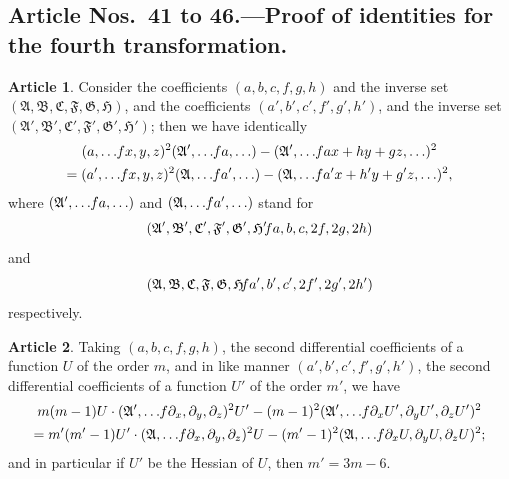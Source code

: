 \documentclass[12pt,a4paper]{article}
\theoremstyle{definition}
\newtheorem{art}{Article}[section]
\begin{document}
\subsection*{Article Nos.\ 41 to 46.---Proof of identities for the fourth transformation.}

\begin{art}
Consider the coefficients $(a, b, c, f, g, h)$ and the inverse set $(\mathfrak{A}, \mathfrak{B}, \mathfrak{C}, \mathfrak{F}, \mathfrak{G}, \mathfrak{H})$, and the coefficients $(a', b', c', f', g', h')$, and the inverse set $(\mathfrak{A}', \mathfrak{B}', \mathfrak{C}', \mathfrak{F}', \mathfrak{G}', \mathfrak{H}')$; then we have identically
\begin{multline*}
(a, \ldots \hspace{-2pt} fx, y, z)^2(\mathfrak{A}', \ldots \hspace{-2pt} fa, \ldots) - (\mathfrak{A}', \ldots \hspace{-2pt} fax + hy + gz, \ldots)^2 \\
= (a', \ldots \hspace{-2pt} fx, y, z)^2(\mathfrak{A}, \ldots \hspace{-2pt} fa', \ldots) - (\mathfrak{A}, \ldots \hspace{-2pt} fa'x + h'y + g'z, \ldots)^2,
\end{multline*}
where $(\mathfrak{A}', \ldots \hspace{-2pt} fa, \ldots)$ and $(\mathfrak{A}, \ldots \hspace{-2pt} fa', \ldots)$ stand for
\[
(\mathfrak{A}', \mathfrak{B}', \mathfrak{C}', \mathfrak{F}', \mathfrak{G}', \mathfrak{H}' \hspace{-2pt} fa, b, c, 2f, 2g, 2h)
\]
and
\[
(\mathfrak{A}, \mathfrak{B}, \mathfrak{C}, \mathfrak{F}, \mathfrak{G}, \mathfrak{H} \hspace{-2pt} fa', b', c', 2f', 2g', 2h')
\]
respectively.
\end{art}

\begin{art}
Taking $(a, b, c, f, g, h)$, the second differential coefficients of a function $U$ of the order $m$, and in like manner $(a', b', c', f', g', h')$, the second differential coefficients of a function $U'$ of the order $m'$, we have
\begin{multline*}
m(m - 1)U \cdot (\mathfrak{A}', \ldots \hspace{-2pt} f\partial_x, \partial_y, \partial_z)^2 U' - (m - 1)^2(\mathfrak{A}', \ldots \hspace{-2pt} f\partial_x U', \partial_y U', \partial_z U')^2 \\
= m'(m' - 1)U' \cdot (\mathfrak{A}, \ldots \hspace{-2pt} f\partial_x, \partial_y, \partial_z)^2 U - (m' - 1)^2(\mathfrak{A}, \ldots \hspace{-2pt} f\partial_x U, \partial_y U, \partial_z U)^2;
\end{multline*}
and in particular if $U'$ be the Hessian of $U$, then $m' = 3m - 6$.
\end{art}
\end{document}
